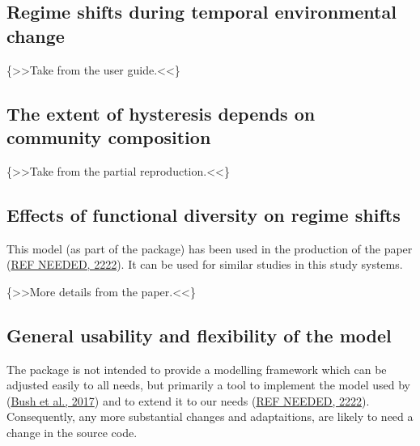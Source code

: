 \documentclass[
]{article}
\begin{document}
\hypertarget{regime-shifts-during-temporal-environmental-change}{%
\subsection{Regime shifts during temporal environmental change}\label{regime-shifts-during-temporal-environmental-change}}

\{\textgreater\textgreater Take from the user guide.\textless\textless\}

\hypertarget{the-extent-of-hysteresis-depends-on-community-composition}{%
\subsection{The extent of hysteresis depends on community composition}\label{the-extent-of-hysteresis-depends-on-community-composition}}

\{\textgreater\textgreater Take from the partial reproduction.\textless\textless\}

\hypertarget{effects-of-functional-diversity-on-regime-shifts}{%
\subsection{Effects of functional diversity on regime shifts}\label{effects-of-functional-diversity-on-regime-shifts}}

This model (as part of the package) has been used in the production of the paper (\protect\hyperlink{ref-REF_NEEDED}{REF NEEDED, 2222}). It can be used for similar studies in this study systems.

\{\textgreater\textgreater More details from the paper.\textless\textless\}

\hypertarget{general-usability-and-flexibility-of-the-model}{%
\subsection{General usability and flexibility of the model}\label{general-usability-and-flexibility-of-the-model}}

The package is not intended to provide a modelling framework which can be adjusted easily to all needs, but primarily a tool to implement the model used by (\protect\hyperlink{ref-Bush2017}{Bush et al., 2017}) and to extend it to our needs (\protect\hyperlink{ref-REF_NEEDED}{REF NEEDED, 2222}). Consequently, any more substantial changes and adaptaitions, are likely to need a change in the source code.
\end{document}
